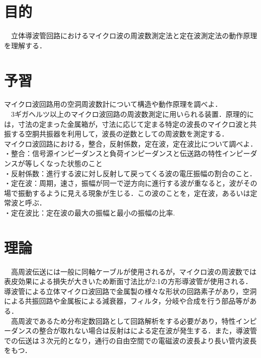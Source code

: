 

\pagestyle{fancy}
\section{目的}
　立体導波管回路におけるマイクロ波の周波数測定法と定在波測定法の動作原理を理解する．

\section{予習}
マイクロ波回路用の空洞周波数計について構造や動作原理を調べよ．\\
　3ギガヘルツ以上のマイクロ波回路の周波数測定に用いられる装置．原理的には，寸法の定まった金属箱が，寸法に応じて定まる特定の波長のマイクロ波と共振する空胴共振器を利用して，波長の逆数としての周波数を測定する．\\

マイクロ波回路における，整合，反射係数，定在波，定在波比について調べよ．\\
・整合：信号源インピーダンスと負荷インピーダンスと伝送路の特性インピーダンスが等しくなった状態のこと\\
・反射係数：進行する波に対し反射して戻ってくる波の電圧振幅の割合のこと．\\
・定在波：周期，速さ，振幅が同一で逆方向に進行する波が重なると，波がその場で振動するように見える現象が生じる．この波のことを，定在波，あるいは定常波と呼ぶ．\\
・定在波比：定在波の最大の振幅と最小の振幅の比率.\\

\section{理論\label{riron}}
　高周波伝送には一般に同軸ケーブルが使用されるが，マイクロ波の周波数では表皮効果による損失が大きいため断面寸法比が2:1の方形導波管が使用される．\\
導波管による立体マイクロ波回路で金属製の様々な形状の回路素子があり，空洞による共振回路や金属板による減衰器，フィルタ，分岐や合成を行う部品等がある．\\
　高周波であるため分布定数回路として回路解析をする必要があり，特性インピーダンスの整合が取れない場合は反射はによる定在波が発生する．また，導波管での伝送は３次元的となり，通行の自由空間での電磁波の波長より長い管内波長をもつ．\\

